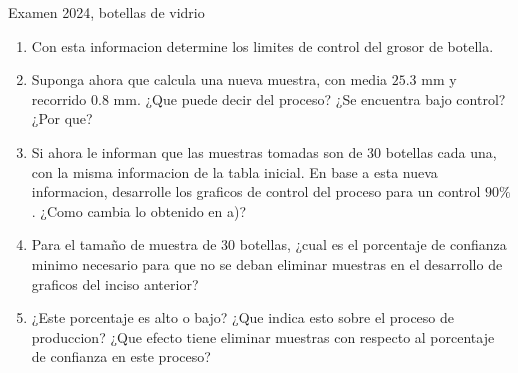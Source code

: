 \begin{enunciado}{Examen 2024, botellas de vidrio}
\begin{enumerate}[label=\alph*)]
  \item Con esta informacion determine los limites de control del grosor de botella.
  \item Suponga ahora que calcula una nueva muestra, con media $25.3$ mm y recorrido $0.8$ mm. ¿Que puede decir del proceso? ¿Se encuentra bajo control? ¿Por que?
  \item Si ahora le informan que las muestras tomadas son de 30 botellas cada una, con la misma informacion de la tabla inicial. En base a esta nueva informacion, desarrolle los graficos de control del proceso para un control $90\%$. ¿Como cambia lo obtenido en a)?
  \item Para el tamaño de muestra de 30 botellas, ¿cual es el porcentaje de confianza minimo necesario para que no se deban eliminar muestras en el desarrollo de graficos del inciso anterior?
  \item ¿Este porcentaje es alto o bajo? ¿Que indica esto sobre el proceso de produccion? ¿Que efecto tiene eliminar muestras con respecto al porcentaje de confianza en este proceso?
\end{enumerate}
\end{enunciado}

